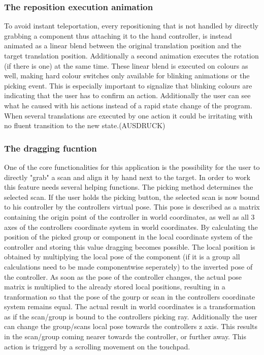 \documentclass[hyperref,english,bachelorofscience,bibnum]{cgvpub}
\begin{document}
\subsubsection{The reposition execution animation}

To avoid instant teleportation, every repositioning that is not handled by directly grabbing a component thus attaching it to the hand controller, is instead animated as a linear blend between the original translation position and the target translation position. Additionally a second animation executes the rotation (if there is one) at the same time.
These linear blend is executed on colours as well, making hard colour switches only available for blinking animations or the picking event. This is especially important to signalize that blinking colours are indicating that the user has to confirm an action. Additionally the user can see what he caused with his actions instead of a rapid state change of the program. When several translations are executed by one action it could be irritating with no fluent transition to the new state.(AUSDRUCK)

\subsubsection{The dragging fucntion}

One of the core functionalities for this application is the possibility for the user to directly "grab" a scan and align it by hand next to the target. In order to work this feature needs several helping functions. The picking method determines the selected scan. If the user holds the picking button, the selected scan is now bound to his controller by the controllers virtual pose. This pose is described as a matrix containing the origin point of the controller in world coordinates, as well as all 3 axes of the controllers coordinate system in world coordinates. By calculating the position of the picked group or component in the local coordinate system of the controller and storing this value dragging becomes possible. The local position is obtained by multiplying the local pose of the component (if it is a group all calculations need to be made componentwise seperately) to the inverted pose of the controller. As soon as the pose of the controller changes, the actual pose matrix is multiplied to the already stored local positions, resulting in a tranformation so that the pose of the gourp or scan in the controllers coordinate system remains equal. The actual result in world coordinates is a transformation as if the scan/group is bound to the controllers picking ray. Additionally the user can change the group/scans local pose towards the controllers z axis. This results in the scan/group coming nearer towards the controller, or further away. This action is triggerd by a scrolling movement on the touchpad. 
\end{document}
